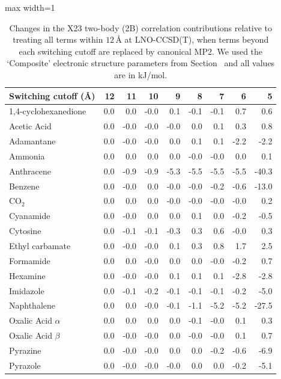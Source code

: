 \begin{table}[h]
\centering
\caption{\label{tab:x23_2b_multilevel_mp2}Changes in the X23 two-body (2B) correlation contributions relative to treating all terms within $12\,$\AA{} at LNO-CCSD(T), when terms beyond each switching cutoff are replaced by canonical MP2. We used the `Composite' electronic structure parameters from Section~ and all values are in kJ/mol.}
\begin{adjustbox}{max width=1\textwidth}
\begin{tabular}{lrrrrrrrr}
\toprule
Switching cutoff (\AA{}) & 12 & 11 & 10 & 9 & 8 & 7 & 6 & 5 \\ 
\midrule
1,4-cyclohexanedione & 0.0 & 0.0 & -0.0 & 0.1 & -0.1 & -0.1 & 0.7 & 0.6 \\
Acetic Acid & 0.0 & -0.0 & -0.0 & -0.0 & 0.0 & 0.1 & 0.3 & 0.8 \\
Adamantane & 0.0 & -0.0 & -0.0 & 0.0 & 0.1 & 0.1 & -2.2 & -2.2 \\
Ammonia & 0.0 & 0.0 & 0.0 & 0.0 & -0.0 & -0.0 & 0.0 & 0.1 \\
Anthracene & 0.0 & -0.9 & -0.9 & -5.3 & -5.5 & -5.5 & -5.5 & -40.3 \\
Benzene & 0.0 & -0.0 & 0.0 & -0.0 & -0.0 & -0.2 & -0.6 & -13.0 \\
CO$_2$ & 0.0 & 0.0 & 0.0 & -0.0 & -0.0 & -0.0 & -0.0 & 0.2 \\
Cyanamide & 0.0 & -0.0 & 0.0 & 0.0 & 0.1 & 0.0 & -0.2 & -0.5 \\
Cytosine & 0.0 & -0.1 & -0.1 & -0.3 & 0.3 & 0.6 & -0.0 & 0.3 \\
Ethyl carbamate & 0.0 & -0.0 & -0.0 & 0.1 & 0.3 & 0.8 & 1.7 & 2.5 \\
Formamide & 0.0 & 0.0 & -0.0 & 0.0 & 0.0 & -0.0 & -0.2 & 0.7 \\
Hexamine & 0.0 & -0.0 & -0.0 & 0.1 & 0.1 & 0.1 & -2.8 & -2.8 \\
Imidazole & 0.0 & -0.1 & -0.2 & -0.1 & -0.1 & -0.1 & -0.2 & -5.0 \\
Naphthalene & 0.0 & 0.0 & -0.0 & -0.1 & -1.1 & -5.2 & -5.2 & -27.5 \\
Oxalic Acid $\alpha$ & 0.0 & 0.0 & 0.0 & 0.0 & -0.1 & -0.0 & 0.1 & 0.3 \\
Oxalic Acid $\beta$ & 0.0 & -0.0 & -0.0 & 0.0 & -0.0 & -0.0 & 0.1 & 0.7 \\
Pyrazine & 0.0 & -0.0 & -0.0 & 0.0 & 0.0 & -0.2 & -0.6 & -6.9 \\
Pyrazole & 0.0 & -0.0 & -0.0 & -0.0 & 0.0 & 0.0 & -0.2 & -5.1 \\

\end{tabular}
\end{adjustbox}
\end{table}
